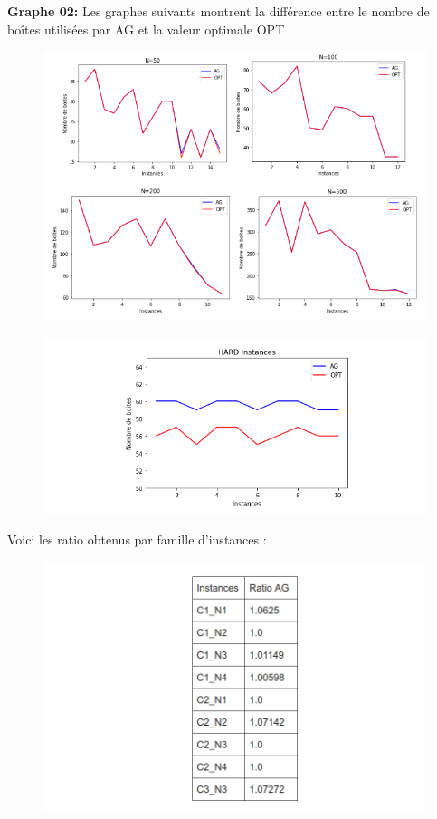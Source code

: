 \documentclass{article}
\begin{document}
\textbf{Graphe 02:}
Les graphes suivants montrent la différence entre le nombre de boîtes utilisées par AG et  la valeur optimale OPT
\begin{figure}[H]
  \includegraphics[width=\linewidth]{../figures/pic08.PNG}
\end{figure}
\begin{figure}[H]
  \includegraphics[width=\linewidth]{../figures/pic09.PNG}
\end{figure}
Voici les ratio obtenus par famille d’instances :
\begin{figure}[H]
  \includegraphics[width=\linewidth]{../figures/pic10.PNG}
\end{figure}
\end{document}
